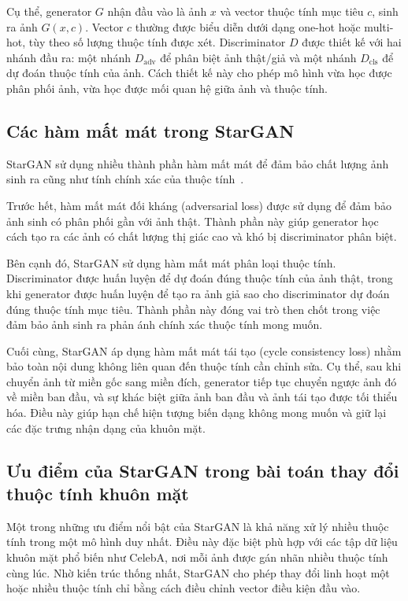\documentclass[../DoAn.tex]{subfiles}
\begin{document}
Cụ thể, generator $G$ nhận đầu vào là ảnh $x$ và vector thuộc tính mục tiêu $c$, sinh ra ảnh $G(x, c)$. Vector $c$ thường được biểu diễn dưới dạng one-hot hoặc multi-hot, tùy theo số lượng thuộc tính được xét. Discriminator $D$ được thiết kế với hai nhánh đầu ra: một nhánh $D_{\text{adv}}$ để phân biệt ảnh thật/giả và một nhánh $D_{\text{cls}}$ để dự đoán thuộc tính của ảnh. Cách thiết kế này cho phép mô hình vừa học được phân phối ảnh, vừa học được mối quan hệ giữa ảnh và thuộc tính.

\subsection{Các hàm mất mát trong StarGAN}

StarGAN sử dụng nhiều thành phần hàm mất mát để đảm bảo chất lượng ảnh sinh ra cũng như tính chính xác của thuộc tính~\cite{Choi2018StarGAN}.

Trước hết, hàm mất mát đối kháng (adversarial loss) được sử dụng để đảm bảo ảnh sinh có phân phối gần với ảnh thật. Thành phần này giúp generator học cách tạo ra các ảnh có chất lượng thị giác cao và khó bị discriminator phân biệt.

Bên cạnh đó, StarGAN sử dụng hàm mất mát phân loại thuộc tính. Discriminator được huấn luyện để dự đoán đúng thuộc tính của ảnh thật, trong khi generator được huấn luyện để tạo ra ảnh giả sao cho discriminator dự đoán đúng thuộc tính mục tiêu. Thành phần này đóng vai trò then chốt trong việc đảm bảo ảnh sinh ra phản ánh chính xác thuộc tính mong muốn.

Cuối cùng, StarGAN áp dụng hàm mất mát tái tạo (cycle consistency loss) nhằm bảo toàn nội dung không liên quan đến thuộc tính cần chỉnh sửa. Cụ thể, sau khi chuyển ảnh từ miền gốc sang miền đích, generator tiếp tục chuyển ngược ảnh đó về miền ban đầu, và sự khác biệt giữa ảnh ban đầu và ảnh tái tạo được tối thiểu hóa. Điều này giúp hạn chế hiện tượng biến dạng không mong muốn và giữ lại các đặc trưng nhận dạng của khuôn mặt.

\subsection{Ưu điểm của StarGAN trong bài toán thay đổi thuộc tính khuôn mặt}

Một trong những ưu điểm nổi bật của StarGAN là khả năng xử lý nhiều thuộc tính trong một mô hình duy nhất. Điều này đặc biệt phù hợp với các tập dữ liệu khuôn mặt phổ biến như CelebA, nơi mỗi ảnh được gán nhãn nhiều thuộc tính cùng lúc. Nhờ kiến trúc thống nhất, StarGAN cho phép thay đổi linh hoạt một hoặc nhiều thuộc tính chỉ bằng cách điều chỉnh vector điều kiện đầu vào.
\end{document}
